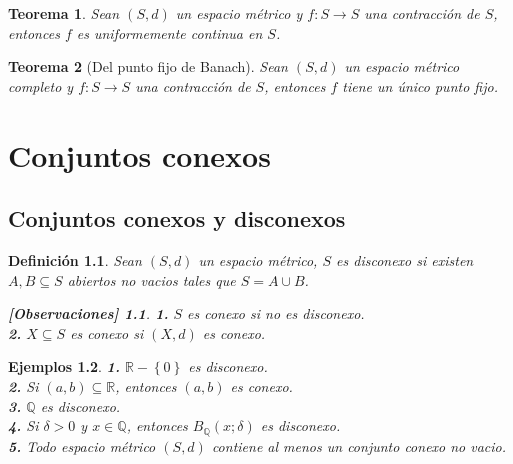\documentclass[oneside]{book} %
\theoremstyle{Teorema}
\newtheorem{Definicion}{Definición}[chapter]
\newtheorem{Teorema}[Definicion]{Teorema}
\theoremstyle{Ejemplos}
\newtheorem{Ejemplos}[Definicion]{Ejemplos}
\theoremstyle{[Obs]}
\newtheorem*{Obs}{[Observaciones]}
\renewcommand{\{}{\left\lbrace} %
\renewcommand{\}}{\right\rbrace} %
\renewcommand{\u}{\cup} %
\renewcommand{\sc}{\subseteq} %
\newcommand{\R}{\mathbb{R}} %
\begin{document}
			\begin{Teorema}

				Sean $(S, d)$ un espacio métrico y $f : S \to S$ una contracción de $S$, entonces $f$ es uniformemente continua en $S$. \\

			\end{Teorema}

			\begin{Teorema}[Del punto fijo de Banach]

				Sean $(S, d)$ un espacio métrico completo y $f : S \to S$ una contracción de $S$, entonces $f$ tiene un único punto fijo. \\

			\end{Teorema}

	\chapter{Conjuntos conexos}

		\section{Conjuntos conexos y disconexos}

			\begin{Definicion}

				Sean $(S, d)$ un espacio métrico, $S$ es disconexo si existen $A, B \sc S$ abiertos no vacios tales que $S = A \u B$. \\

				\begin{Obs}
				
					\hfill
				
					\textbf{1.} $S$ es conexo si no es disconexo. \\

					\textbf{2.} $X \sc S$ es conexo si $(X, d)$ es conexo. \\
				
				\end{Obs}

			\end{Definicion}

			\begin{Ejemplos}

				\hfill

				\textbf{1.} $\R - \{ 0 \}$ es disconexo. \\

				\textbf{2.} Si $(a, b) \sc \R$, entonces $(a, b)$ es conexo. \\

				\textbf{3.} $\mathbb{Q}$ es disconexo. \\

				\textbf{4.} Si $\delta > 0$ y $x \in \mathbb{Q}$, entonces $B_{\mathbb{Q}}(x;\delta)$ es disconexo. \\

				\textbf{5.} Todo espacio métrico $(S, d)$ contiene al menos un conjunto conexo no vacio. \\

			\end{Ejemplos}
\end{document}
